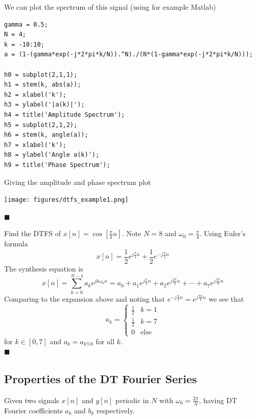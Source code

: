 \begin{example}
We can plot the spectrum of this signal (using for example Matlab)
\begin{verbatim}
gamma = 0.5;
N = 4;
k = -10:10;
a = (1-(gamma*exp(-j*2*pi*k/N)).^N)./(N*(1-gamma*exp(-j*2*pi*k/N)));

h0 = subplot(2,1,1);
h1 = stem(k, abs(a));
h2 = xlabel('k');
h3 = ylabel('|a(k)|');
h4 = title('Amplitude Spectrum');
h5 = subplot(2,1,2);
h6 = stem(k, angle(a));
h7 = xlabel('k');
h8 = ylabel('Angle a(k)');
h9 = title('Phase Spectrum');
\end{verbatim}
Giving the amplitude and phase spectrum plot
\begin{center}
\texttt{[image: figures/dtfs\_example1.png]}
\end{center}
$\blacksquare$
\end{example}

\begin{example}
  Find the DTFS of $x[n] = \cos[\tfrac{\pi}{4}n]$. Note $N=8$ and $\omega_0 = \tfrac{\pi}{4}$. Using Euler's formula
  \[
  x[n] = \frac{1}{2}e^{j\frac{\pi}{4}n} + \frac{1}{2}e^{-j\frac{\pi}{4}n}
  \]
  The synthesis equation is
  \[
  x[n] = \sum\limits_{k = 0}^{N-1} a_k e^{jk\omega_0n} = a_0 + a_1e^{j\frac{\pi}{4}n}+ a_2e^{j\frac{2\pi}{4}n} + \cdots + a_7e^{j\frac{7\pi}{4}n}  
  \]
  Comparing to the expansion above and noting that $e^{-j\frac{\pi}{4}n} = e^{j\frac{7\pi}{4}n}$ we see that
  \[
  a_k = \begin{cases}
    \frac{1}{2} & k=1\\
    \frac{1}{2} & k=7\\
    0 & \mbox{else}
  \end{cases}
  \]
  for $k \in [0,7]$ and $a_k = a_{k\%8}$ for all $k$.\\
  $\blacksquare$
\end{example}

\subsection{Properties of the DT Fourier Series}

Given two signals $x[n]$ and $y[n]$ periodic in $N$ with $\omega_0 = \frac{2\pi}{N}$, having DT Fourier coefficients
$a_k$ and $b_k$ respectively.

